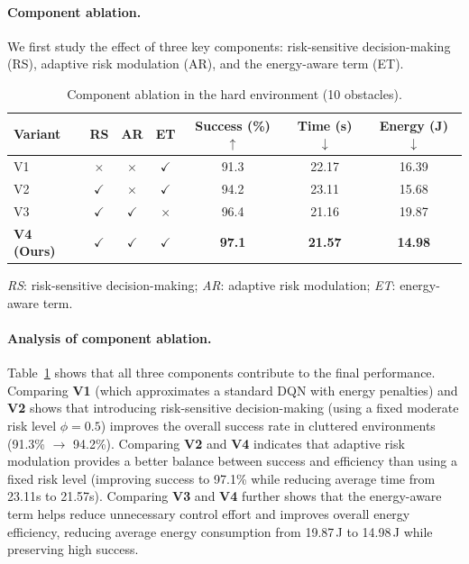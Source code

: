 \paragraph{Component ablation.}
We first study the effect of three key components: risk-sensitive decision-making (RS), adaptive risk modulation (AR), and the energy-aware term (ET).

\begin{table}[t]
\centering
\caption{Component ablation in the hard environment (10 obstacles).}
\label{tab:ablation_components}
\setlength{\tabcolsep}{5pt}
\renewcommand{\arraystretch}{1.1}
\begin{tabular*}{\linewidth}{@{\extracolsep{\fill}}lcccccc@{}}
\hline
Variant & RS & AR & ET & Success (\%) $\uparrow$ & Time (s) $\downarrow$ & Energy (J) $\downarrow$ \\
\hline
V1 & $\times$     & $\times$     & $\checkmark$ & 91.3 & 22.17 & 16.39 \\
V2 & $\checkmark$ & $\times$     & $\checkmark$ & 94.2 & 23.11 & 15.68 \\
V3 & $\checkmark$ & $\checkmark$ & $\times$     & 96.4 & 21.16 & 19.87 \\
\textbf{V4 (Ours)} & $\checkmark$ & $\checkmark$ & $\checkmark$ & \textbf{97.1} & \textbf{21.57} & \textbf{14.98} \\
\hline
\end{tabular*}

\vspace{2pt}
\footnotesize
\textit{RS}: risk-sensitive decision-making; \textit{AR}: adaptive risk modulation; \textit{ET}: energy-aware term.
\end{table}

\paragraph{Analysis of component ablation.}
Table~\ref{tab:ablation_components} shows that all three components contribute to the final performance.
Comparing \textbf{V1} (which approximates a standard DQN with energy penalties) and \textbf{V2} shows that introducing risk-sensitive decision-making (using a fixed moderate risk level $\phi=0.5$) improves the overall success rate in cluttered environments (91.3\% $\to$ 94.2\%).
Comparing \textbf{V2} and \textbf{V4} indicates that adaptive risk modulation provides a better balance between success and efficiency than using a fixed risk level (improving success to 97.1\% while reducing average time from 23.11s to 21.57s).
Comparing \textbf{V3} and \textbf{V4} further shows that the energy-aware term helps reduce unnecessary control effort and improves overall energy efficiency, reducing average energy consumption from 19.87\,J to 14.98\,J while preserving high success.

